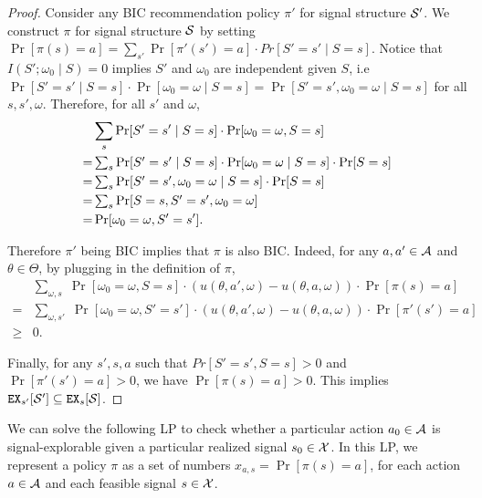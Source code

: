 \begin{proof}
Consider any BIC recommendation policy $\pi'$ for signal structure $\S'$. We construct $\pi$ for signal structure $\S$ by setting $\Pr[\pi(s) = a] = \sum_{s'} \Pr[\pi'(s') = a] \cdot Pr[S' = s'\mid S = s]$. Notice that $I(S' ; \omega_0\mid S) = 0$ implies $S'$ and $\omega_0$ are independent given $S$, i.e $\Pr[S' = s'\mid S=s] \cdot \Pr[\omega_0 = \omega\mid S=s] = \Pr[S'=s', \omega_0 = \omega\mid S=s]$ for all $s,s',\omega$. Therefore, for all $s'$ and $\omega$,
\begin{align*}
\textstyle
&\sum_s \Pr[S' = s'\mid S = s] \cdot \Pr[\omega_0 = \omega, S= s]\\
=& \textstyle \sum_s \Pr[S' = s'\mid S=s]
    \cdot \Pr[\omega_0 = \omega\mid S=s] \cdot \Pr[S=s] \\
=& \textstyle  \sum_s \Pr[S'=s',\omega_0 =\omega\mid S=s] \cdot \Pr[S=s] \\
= &\textstyle  \sum_s \Pr[S=s,S'=s',\omega_0 =\omega] \\
= &\Pr[\omega_0 =\omega, S'=s'].
\end{align*}

Therefore $\pi'$ being BIC implies that $\pi$ is also BIC. Indeed, for any $a,a' \in \A$ and $\theta \in \varTheta$, by plugging in the definition of $\pi$, 
\begin{align*}
&\textstyle \sum_{\omega,s}\; \Pr[\omega_0 = \omega, S = s] \cdot (u(\theta,a', \omega) - u(\theta,a,\omega)) \cdot \Pr[\pi(s) = a] \\
=& \textstyle \sum_{\omega,s'}\;\Pr[\omega_0 = \omega, S' = s'] \cdot (u(\theta,a', \omega) - u(\theta,a,\omega)) \cdot \Pr[\pi'(s') = a]\\
\geq& 0.
\end{align*}


Finally, for any $s', s ,a$ such that $Pr[S' = s',S = s] >0 $ and $\Pr[\pi'(s') = a] >0$, we have $\Pr[\pi(s) = a] > 0$. This implies $\EX_{s'}[\S'] \subseteq \EX_s[\S]$.
\end{proof}

We can solve the following LP to check whether a particular action $a_0 \in\A$ is signal-explorable given a particular realized signal $s_0\in\X$. In this LP, we represent a policy $\pi$ as a set of numbers
    $x_{a,s} = \Pr[\pi(s)=a]$,
for each action $a\in \A$ and each feasible signal $s\in \X$.

